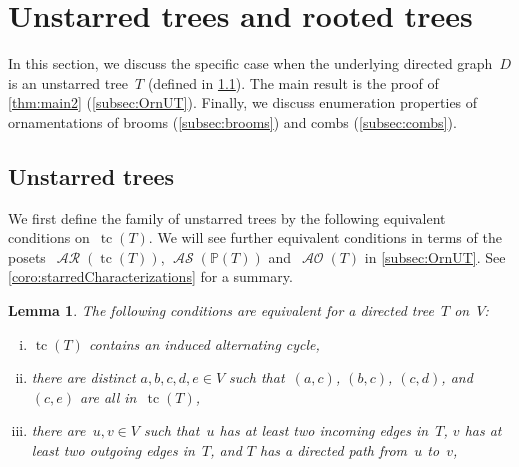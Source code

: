 \documentclass{amsart}
\newtheorem{lemma}[theorem]{Lemma}
\theoremstyle{definition}
\renewcommand{\c}[1]{\mathcal{#1}} %
\DeclareMathOperator{\tc}{tc} %
\DeclareMathOperator{\AOrn}{\c{AO}}  %
\DeclareMathOperator{\AReori}{\c{AR}}  %
\DeclareMathOperator{\ASour}{\mathcal{AS}}  %
\newcommand{\PP}{\mathbb P} %
\begin{document}

\section{Unstarred trees and rooted trees}
\label{sec:unstarredTrees}

In this section, we discuss the specific case when the underlying directed graph~$D$ is an unstarred tree~$T$ (defined in \cref{subsec:unstarredTrees}).
The main result is the proof of \cref{thm:main2} (\cref{subsec:OrnUT}).
Finally, we discuss enumeration properties of ornamentations of brooms (\cref{subsec:brooms}) and combs (\cref{subsec:combs}).


\subsection{Unstarred trees}
\label{subsec:unstarredTrees}


We first define the family of unstarred trees by the following equivalent conditions on~$\tc(T)$.
We will see further equivalent conditions in terms of the posets~$\AReori(\tc(T))$, $\ASour(\PP(T))$ and~$\AOrn(T)$ in \cref{subsec:OrnUT}.
See \cref{coro:starredCharacterizations} for a summary.

\begin{lemma}
\label{lem:starredCharacterization}
The following conditions are equivalent for a directed tree~$T$ on~$V$:
\begin{enumerate}[(i)]
\item $\tc(T)$ contains an induced alternating cycle,
\item there are distinct $a,b,c,d,e \in V$ such that~$(a,c)$, $(b,c)$, $(c,d)$, and~$(c,e)$ are all in~$\tc(T)$,
\item there are~$u,v \in V$ such that~$u$ has at least two incoming edges in~$T$, $v$ has at least two outgoing edges in~$T$, and $T$ has a directed path from~$u$ to~$v$,
\end{enumerate}
\end{lemma}
\end{document}
